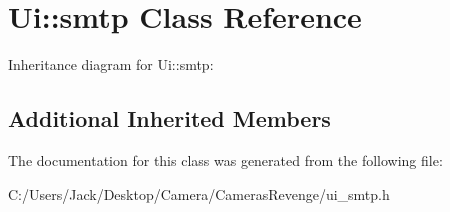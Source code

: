 \hypertarget{class_ui_1_1smtp}{\section{Ui\+:\+:smtp Class Reference}
\label{class_ui_1_1smtp}
}


Inheritance diagram for Ui\+:\+:smtp\+:
\subsection*{Additional Inherited Members}


The documentation for this class was generated from the following file\+:\begin{DoxyCompactItemize}
\item 
C\+:/\+Users/\+Jack/\+Desktop/\+Camera/\+Cameras\+Revenge/ui\+\_\+smtp.\+h\end{DoxyCompactItemize}
